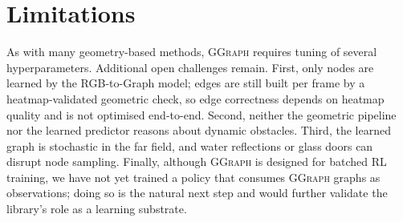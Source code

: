 \documentclass{article}
\newcommand{\sysname}{\textcolor{ggcolor}{\textsc{GGraph}}\xspace}
\begin{document}
\section{Limitations}
\label{sec:limitations}
As with many geometry-based methods, \sysname requires tuning of
several hyperparameters. Additional open challenges remain. First,
only nodes are learned by the RGB-to-Graph model; edges are still
built per frame by a heatmap-validated geometric check, so edge
correctness depends on heatmap quality and is not optimised
end-to-end. Second, neither the geometric pipeline nor the learned
predictor reasons about dynamic obstacles. Third, the learned graph
is stochastic in the far field, and water reflections or glass doors
can disrupt node sampling. Finally, although \sysname is designed
for batched RL training, we have not yet trained a policy that
consumes \sysname graphs as observations; doing so is the natural
next step and would further validate the library's role as a
learning substrate.





\clearpage


\end{document}
